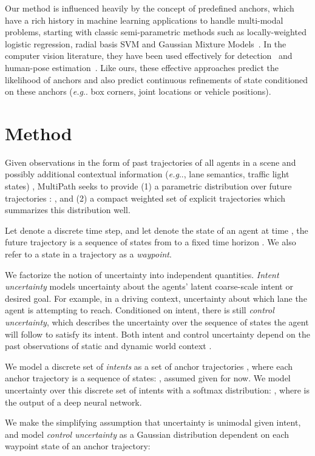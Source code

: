 \documentclass{article}
\makeatletter
\DeclareRobustCommand\onedot{\futurelet\@let@token\@onedot}
\def\@onedot{\ifx\@let@token.\else.\null\fi\xspace}
\def\eg{\emph{e.g}\onedot} \def\Eg{\emph{E.g}\onedot}
\newcommand{\multiflow}{MultiPath\xspace}
\makeatother
\begin{document}
Our method is influenced heavily by the concept of predefined anchors, which have a rich history in machine learning applications to handle multi-modal problems, starting with classic semi-parametric methods such as locally-weighted logistic regression, radial basis SVM and Gaussian Mixture Models~\cite{Bishop06}.  In the computer vision literature, they have been used effectively for detection~\cite{Erhan14} and human-pose estimation~\cite{Yang12}.  Like ours, these effective approaches predict the likelihood of anchors and also predict continuous refinements of state conditioned on these anchors (\eg box corners, joint locations or vehicle positions).


 \section{Method}
\label{sec:method}



Given observations  in the form of past trajectories of all agents in a scene and possibly additional contextual information (\eg, lane semantics, traffic light states)
, \multiflow seeks to provide (1) a parametric distribution over future trajectories : , and (2) a compact weighted set of explicit trajectories which summarizes this distribution well.

Let  denote a discrete time step, and let  denote the state of an agent at time , the future trajectory  is a sequence of states from  to a fixed time horizon . We also refer to a state in a trajectory as a {\em waypoint}.

We factorize the notion of uncertainty into independent quantities. {\em Intent uncertainty} models uncertainty about the agents' latent coarse-scale intent or desired goal. For example, in a driving context, uncertainty about which lane the agent is attempting to reach. Conditioned on intent, there is still {\em control uncertainty}, which describes the uncertainty over the sequence of states the agent will follow to satisfy its intent.  Both intent and control uncertainty depend on the past observations of static and dynamic world context .

We model a discrete set of {\em intents} as a set of  anchor trajectories , where each anchor trajectory is a sequence of states: , assumed given for now.  We model uncertainty over this discrete set of intents with a softmax distribution: ,
where  is the output of a deep neural network. 

We make the simplifying assumption that uncertainty is unimodal given intent, and model {\em control uncertainty} as a Gaussian distribution dependent on each waypoint state of an anchor trajectory:
\end{document}
